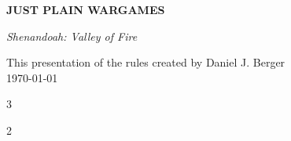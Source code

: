 \documentclass[11pt]{article}
\begin{document}

\begin{titlepage}
\centering
\vspace*{0.1cm}

{\Huge\bfseries\color{titleblack} JUST PLAIN WARGAMES\par}
\vspace{0.45cm}
{\LARGE\itshape Shenandoah: Valley of Fire\par}
\vspace{0.2cm}
{\small This presentation of the rules created by Daniel J. Berger\\\today\par}

\vspace{0.45cm}
\begingroup
\scriptsize
\setlength{\columnsep}{10pt}
\begin{multicols}{3}
\tableofcontents
\end{multicols}
\endgroup

\vfill
\end{titlepage}

\restoregeometry
{}
\setcounter{page}{1}

\begin{multicols*}{2}
























\end{multicols*}

\clearpage

\end{document}
